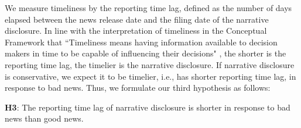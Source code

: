 \documentclass[a4paper]{article}
\begin{document}
\begin{spacing}{2}
We measure timeliness by the reporting time lag, defined as the number of days elapsed between the news release date and the filing date of the narrative disclosure. In line with the interpretation of timeliness in the Conceptual Framework that ``Timeliness means having information available to decision makers in time to be capable of influencing their decisions" , the shorter is the reporting time lag, the timelier is the narrative disclosure. If narrative disclosure is conservative, we expect it to be timelier, i.e., has shorter reporting time lag, in response to bad news. Thus, we formulate our third hypothesis as follows:

\begin{center}
	\textbf{H3}: The reporting time lag of narrative disclosure is shorter in response to bad news than good news.
\end{center}

\begin{comment}

\end{comment}
\end{spacing}
\end{document}
